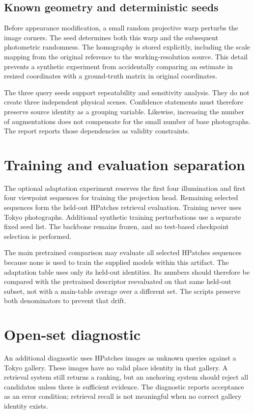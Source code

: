\subsection{Known geometry and deterministic seeds}
Before appearance modification, a small random projective warp perturbs the image corners. The seed determines both this warp and the subsequent photometric randomness. The homography is stored explicitly, including the scale mapping from the original reference to the working-resolution source. This detail prevents a synthetic experiment from accidentally comparing an estimate in resized coordinates with a ground-truth matrix in original coordinates.

The three query seeds support repeatability and sensitivity analysis. They do not create three independent physical scenes. Confidence statements must therefore preserve source identity as a grouping variable. Likewise, increasing the number of augmentations does not compensate for the small number of base photographs. The report reports those dependencies as validity constraints.

\section{Training and evaluation separation}
The optional adaptation experiment reserves the first four illumination and first four viewpoint sequences for training the projection head. Remaining selected sequences form the held-out HPatches retrieval evaluation. Training never uses Tokyo photographs. Additional synthetic training perturbations use a separate fixed seed list. The backbone remains frozen, and no test-based checkpoint selection is performed.

The main pretrained comparison may evaluate all selected HPatches sequences because none is used to train the supplied models within this artifact. The adaptation table uses only its held-out identities. Its numbers should therefore be compared with the pretrained descriptor reevaluated on that same held-out subset, not with a main-table average over a different set. The scripts preserve both denominators to prevent that drift.

\section{Open-set diagnostic}
An additional diagnostic uses HPatches images as unknown queries against a Tokyo gallery. These images have no valid place identity in that gallery. A retrieval system still returns a ranking, but an anchoring system should reject all candidates unless there is sufficient evidence. The diagnostic reports acceptance as an error condition; retrieval recall is not meaningful when no correct gallery identity exists.

